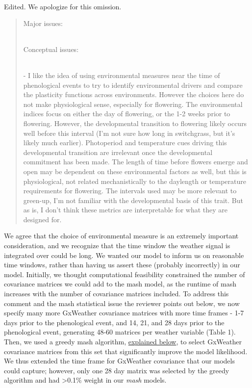 \documentclass[
  letterpaper,
  DIV=11,
  numbers=noendperiod]{scrartcl}
\begin{document}
Edited. We apologize for this omission.

\begin{quote}
\begin{tcolorbox}[enhanced jigsaw, colframe=quarto-callout-warning-color-frame, rightrule=.15mm, leftrule=.75mm, left=2mm, breakable, toprule=.15mm, arc=.35mm, bottomrule=.15mm, opacityback=0, colback=white]

Major issues:\\
\strut \\
Conceptual issues:\\
\strut \\
- I like the idea of using environmental measures near the time of
phenological events to try to identify environmental drivers and compare
the plasticity functions across environments. However the choices here
do not make physiological sense, especially for flowering. The
environmental indices focus on either the day of flowering, or the 1-2
weeks prior to flowering. However, the developmental transition to
flowering likely occurs well before this interval (I'm not sure how long
in switchgrass, but it's likely much earlier). Photoperiod and
temperature cues driving this developmental transition are irrelevant
once the developmental commitment has been made. The length of time
before flowers emerge and open may be dependent on these environmental
factors as well, but this is physiological, not related mechanistically
to the daylength or temperature requirements for flowering. The
intervals used may be more relevant to green-up, I'm not familiar with
the developmental basis of this trait. But as is, I don't think these
metrics are interpretable for what they are designed for.

\end{tcolorbox}
\end{quote}

We agree that the choice of environmental measure is an extremely
important consideration, and we recognize that the time window the
weather signal is integrated over could be long. We wanted our model to
inform us on reasonable time windows, rather than having us assert these
(probably incorrectly) in our model. Initially, we thought computational
feasibility constrained the number of covariance matrices we could add
to the mash model, as the runtime of mash increases with the number of
covariance matrices included. To address this comment and the mash
statistical issue the reviewer points out below, we now specify many
more GxWeather covariance matrices with more time frames - 1-7 days
prior to the phenological event, and 14, 21, and 28 days prior to the
phenological event, generating 48-60 matrices per weather variable
(Table 1). Then, we used a greedy mash algorithm,
\hyperref[fig-greedy]{explained below}, to select GxWeather covariance
matrices from this set that significantly improve the model likelihood.
We thus extended the time frame for GxWeather covariance that our models
could capture; however, only one 28 day matrix was selected by the
greedy algorithm and had \textgreater0.1\% weight in our \emph{mash}
models.
\end{document}
